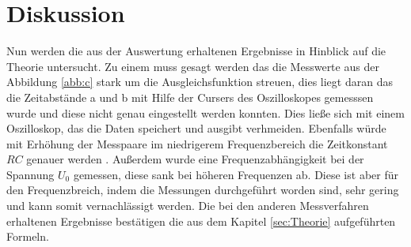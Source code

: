 \section{Diskussion}
\label{sec:Diskussion}
Nun werden die aus der Auswertung erhaltenen
Ergebnisse in Hinblick auf die Theorie untersucht.
Zu einem muss gesagt werden das die Messwerte aus der Abbildung \ref{abb:c} stark
um die Ausgleichsfunktion streuen, dies liegt daran das die Zeitabstände a und b mit
Hilfe der Cursers des Oszilloskopes gemesssen wurde und diese nicht genau eingestellt werden konnten.
Dies ließe sich mit einem Oszilloskop, das die Daten speichert und ausgibt verhmeiden.
Ebenfalls würde mit Erhöhung der Messpaare im niedrigerem Frequenzbereich die Zeitkonstant $RC$ genauer werden .
Außerdem wurde eine Frequenzabhängigkeit bei der Spannung $U_0$ gemessen, diese sank bei höheren Frequenzen ab.
Diese ist aber für den Frequenzbreich, indem die Messungen durchgeführt
worden sind, sehr gering und kann somit vernachlässigt werden.
Die bei den anderen Messverfahren erhaltenen Ergebnisse bestätigen
die aus dem Kapitel \ref{sec:Theorie} aufgeführten Formeln.
